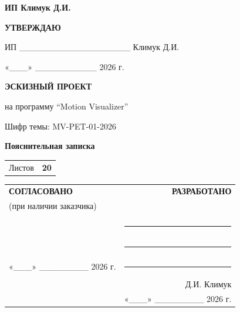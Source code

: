 \documentclass[12pt, a4paper]{article}
\begin{document}
\begin{titlepage}
    \begin{center}
        \vspace*{1cm}
        
        {\large \textbf{ИП Климук Д.И.}}
        
        \vspace{4cm}
        
        {\Large \textbf{УТВЕРЖДАЮ}}
        
        \vspace{0.5cm}
        
        {\large ИП \_\_\_\_\_\_\_\_\_\_\_\_\_\_\_\_\_\_ Климук Д.И.}
        
        \vspace{0.3cm}
        
        {\large «\_\_\_» \_\_\_\_\_\_\_\_\_\_ 2026 г.}
        
        \vspace{4cm}
        
        {\huge \textbf{ЭСКИЗНЫЙ ПРОЕКТ}}
        
        \vspace{0.5cm}
        
        {\Large на программу \enquote{Motion Visualizer}}
        
        \vspace{1cm}
        
        {\large Шифр темы: MV-PET-01-2026}
        
        \vspace{1cm}
        
        {\normalsize \textbf{Пояснительная записка}}
        
        \vfill
        
        \begin{tabular}{ll}
            Листов & \textbf{20} \\
        \end{tabular}
        
        \vspace{1cm}
        
        \begin{tabularx}{\textwidth}{Xr}
            \textbf{СОГЛАСОВАНО} & \textbf{РАЗРАБОТАНО} \\
            (при наличии заказчика) & \\
            & \\
            & \hfill \rule{5cm}{0.4pt} \\
            & \hfill \rule{5cm}{0.4pt} \\
            «\_\_\_» \_\_\_\_\_\_\_\_ 2026 г. & \hfill \rule{5cm}{0.4pt} \\
            & \hfill Д.И. Климук \\
            & «\_\_\_» \_\_\_\_\_\_\_\_ 2026 г.
        \end{tabularx}
    \end{center}
\end{titlepage}
\end{document}
